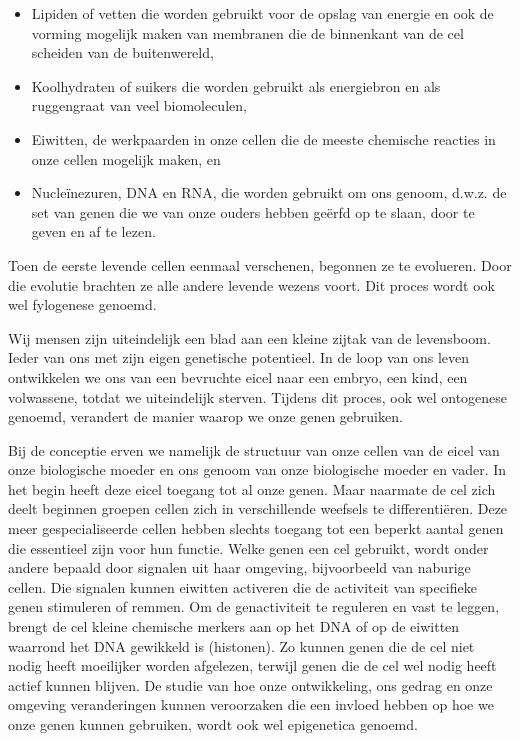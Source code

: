 \documentclass[
  11pt,
]{book}
\providecommand{\tightlist}{%
  \setlength{\itemsep}{0pt}\setlength{\parskip}{0pt}}
\begin{document}
\begin{itemize}
\tightlist
\item
  Lipiden of vetten die worden gebruikt voor de opslag van energie en ook de vorming mogelijk maken van membranen die de binnenkant van de cel scheiden van de buitenwereld,
\item
  Koolhydraten of suikers die worden gebruikt als energiebron en als ruggengraat van veel biomoleculen,
\item
  Eiwitten, de werkpaarden in onze cellen die de meeste chemische reacties in onze cellen mogelijk maken, en
\item
  Nucleïnezuren, DNA en RNA, die worden gebruikt om ons genoom, d.w.z. de set van genen die we van onze ouders hebben geërfd op te slaan, door te geven en af te lezen.
\end{itemize}

Toen de eerste levende cellen eenmaal verschenen, begonnen ze te evolueren. Door die evolutie brachten ze alle andere levende wezens voort. Dit proces wordt ook wel fylogenese genoemd.

Wij mensen zijn uiteindelijk een blad aan een kleine zijtak van de levensboom. Ieder van ons met zijn eigen genetische potentieel. In de loop van ons leven ontwikkelen we ons van een bevruchte eicel naar een embryo, een kind, een volwassene, totdat we uiteindelijk sterven. Tijdens dit proces, ook wel ontogenese genoemd, verandert de manier waarop we onze genen gebruiken.

Bij de conceptie erven we namelijk de structuur van onze cellen van de eicel van onze biologische moeder en ons genoom van onze biologische moeder en vader. In het begin heeft deze eicel toegang tot al onze genen. Maar naarmate de cel zich deelt beginnen groepen cellen zich in verschillende weefsels te differentiëren. Deze meer gespecialiseerde cellen hebben slechts toegang tot een beperkt aantal genen die essentieel zijn voor hun functie. Welke genen een cel gebruikt, wordt onder andere bepaald door signalen uit haar omgeving, bijvoorbeeld van naburige cellen. Die signalen kunnen eiwitten activeren die de activiteit van specifieke genen stimuleren of remmen. Om de genactiviteit te reguleren en vast te leggen, brengt de cel kleine chemische merkers aan op het DNA of op de eiwitten waarrond het DNA gewikkeld is (histonen). Zo kunnen genen die de cel niet nodig heeft moeilijker worden afgelezen, terwijl genen die de cel wel nodig heeft actief kunnen blijven. De studie van hoe onze ontwikkeling, ons gedrag en onze omgeving veranderingen kunnen veroorzaken die een invloed hebben op hoe we onze genen kunnen gebruiken, wordt ook wel epigenetica genoemd.
\end{document}
